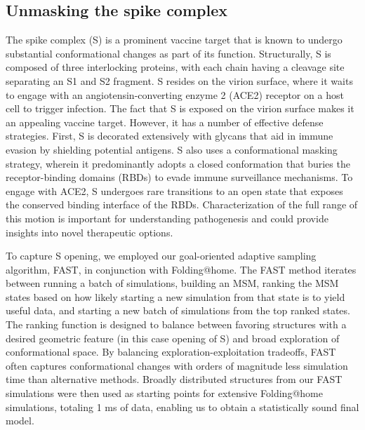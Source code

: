 \documentclass[../main.tex]{subfiles}
\begin{document}
    \subsection{Unmasking the spike complex}
        The spike complex (S) is a prominent vaccine target that is known to undergo substantial conformational changes as part of its function\cite{kirchdoerfer_stabilized_2018,walls_structure_2020,wrapp_cryo-em_2020}. Structurally, S is composed of three interlocking proteins, with each chain having a cleavage site separating an S1 and S2 fragment. S resides on the virion surface, where it waits to engage with an angiotensin-converting enzyme 2 (ACE2) receptor on a host cell to trigger infection\cite{zhang_angiotensin-converting_2020,hoffmann_sars-cov-2_2020}. The fact that S is exposed on the virion surface makes it an appealing vaccine target. However, it has a number of effective defense strategies. First, S is decorated extensively with glycans that aid in immune evasion by shielding potential antigens\cite{watanabe_vulnerabilities_2020}. S also uses a conformational masking strategy, wherein it predominantly adopts a closed conformation that buries the receptor-binding domains (RBDs) to evade immune surveillance mechanisms. To engage with ACE2, S undergoes rare transitions to an open state that exposes the conserved binding interface of the RBDs. Characterization of the full range of this motion is important for understanding pathogenesis and could provide insights into novel therapeutic options.

        To capture S opening, we employed our goal-oriented adaptive sampling algorithm, FAST, in conjunction with Folding@home. The FAST method iterates between running a batch of simulations, building an MSM, ranking the MSM states based on how likely starting a new simulation from that state is to yield useful data, and starting a new batch of simulations from the top ranked states\cite{zimmerman_fast_2015,zimmerman_how_2016}. The ranking function is designed to balance between favoring structures with a desired geometric feature (in this case opening of S) and broad exploration of conformational space. By balancing exploration-exploitation tradeoffs, FAST often captures conformational changes with orders of magnitude less simulation time than alternative methods. Broadly distributed structures from our FAST simulations were then used as starting points for extensive Folding@home simulations, totaling 1 ms of data, enabling us to obtain a statistically sound final model.
\end{document}
